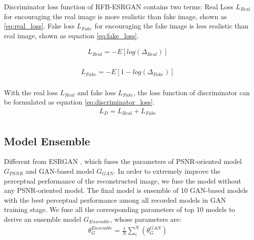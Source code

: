 \documentclass[10pt,twocolumn,letterpaper]{article}
\begin{document}
Discriminator loss function of RFB-ESRGAN contains two terms: Real Loss $L_{Real}$ for encouraging the real image is more realistic than fake image, shown as \eqref{eq:real_loss}. Fake loss $L_{Fake}$ for encouraging the fake image is less realistic than real image, shown as equation \eqref{eq:fake_loss}. 

\begin{equation} \label{eq:real_loss}
\begin{split}
L_{Real} = -E[log(\Delta_{Real})]\\ 
\end{split}
\end{equation}


\begin{equation} \label{eq:fake_loss}
\begin{split}
L_{Fake} = -E[1-log(\Delta_{Fake})]\\ 
\end{split}
\end{equation}

With the real loss $L_{Real}$ and fake loss $L_{Fake}$, the loss function of discriminator can be formulated as equation \eqref{eq:discriminator_loss}.
\begin{equation} \label{eq:discriminator_loss}
\begin{split}
L_{D} = L_{Real} + L_{Fake}\\ 
\end{split}
\end{equation}

\subsection{Model Ensemble}
Different from ESRGAN \cite{wang2018esrgan}, which fuses the parameters of PSNR-oriented model $G_{PSNR}$ and GAN-based model $G_{GAN}$. In order to extremely improve the perceptual performance of the reconstructed image, we fuse the model without any PSNR-oriented model. The final model is ensemble of 10 GAN-based models with the best perceptual performance among all recorded models in GAN training stage. We fuse all the corresponding parameters of top 10 models to derive an ensemble model $G_{Ensemble}$, whose parameters are:
\begin{equation} \label{eq:ensemble}
\begin{split}
\theta_{G}^{Ensemble}=\frac{1}{N} \sum_i^N(\theta_G^{GAN})
\end{split}
\end{equation}
\end{document}
